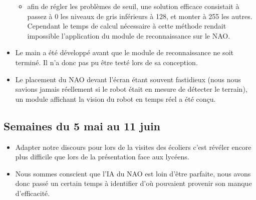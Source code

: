 \begin{itemize}
\begin{itemize}
              \item afin de régler les problèmes de seuil, une solution efficace consistait à passez à 0 les niveaux de gris inférieurs à 128, et monter à 255 les autres.
              Cependant le temps de calcul nécessaire à cette méthode rendait impossible l’application du module de reconnaissance sur le NAO.
            \end{itemize}
      \item Le main a été développé avant que le module de reconnaissance ne soit terminé.
      Il n’a donc pas pu être testé lors de sa conception.
      \item Le placement du NAO devant l’écran étant souvent fastidieux (nous nous savions jamais réellement si le robot était en mesure de détecter le terrain),
      un module affichant la vision du robot en temps réel a été conçu.\\
    \end{itemize}

    \subsection{Semaines du 5 mai au 11 juin}
    \label{sub:Semaines du 5 mai au 11 juin}
      \begin{itemize}
        \item Adapter notre discours pour lors de la visites des écoliers c'est révéler encore plus difficile que lors de la présentation face aux lycéens.
        \item Nous sommes conscient que l'IA du NAO est loin d'être parfaite, nous avons donc passé un certain temps à identifier d'où pouvaient provenir son manque d'efficacité.
      \end{itemize}

\pagebreak
